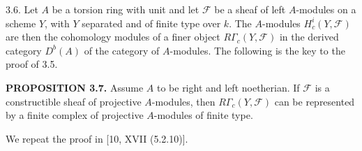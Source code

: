 \documentclass[9pt,twoside]{extarticle}
\begin{document}
{3.6. Let \(A\) be a torsion ring with unit and let \(\mathcal F\) be a sheaf of left \(A\)-modules on a scheme \(Y\), with \(Y\) separated and of finite type over \(k\). The \(A\)-modules \(H_c^i(Y,\mathcal F)\) are then the cohomology modules of a finer object \(R\Gamma_c(Y,\mathcal F)\) in the derived category \(D^b(A)\) of the category of \(A\)-modules. The following is the key to the proof of 3.5.\par

\noindent\textbf{PROPOSITION 3.7.} Assume \(A\) to be right and left noetherian. If \(\mathcal F\) is a constructible sheaf of projective \(A\)-modules, then \(R\Gamma_c(Y,\mathcal F)\) can be represented by a finite complex of projective \(A\)-modules of finite type.\par

We repeat the proof in [10, XVII (5.2.10)].\par
}
\end{document}
